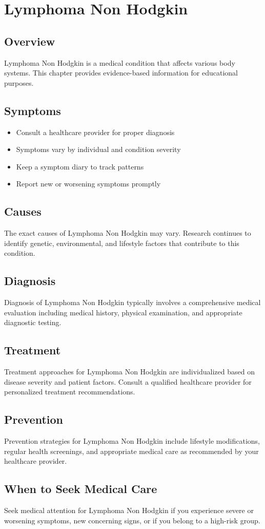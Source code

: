 \chapter{Lymphoma Non Hodgkin}

\section*{Overview}
Lymphoma Non Hodgkin is a medical condition that affects various body systems. This chapter provides evidence-based information for educational purposes.

\section*{Symptoms}
\begin{itemize}
  \item Consult a healthcare provider for proper diagnosis
  \item Symptoms vary by individual and condition severity
  \item Keep a symptom diary to track patterns
  \item Report new or worsening symptoms promptly
\end{itemize}

\section*{Causes}
The exact causes of Lymphoma Non Hodgkin may vary. Research continues to identify genetic, environmental, and lifestyle factors that contribute to this condition.

\section*{Diagnosis}
Diagnosis of Lymphoma Non Hodgkin typically involves a comprehensive medical evaluation including medical history, physical examination, and appropriate diagnostic testing.

\section*{Treatment}
Treatment approaches for Lymphoma Non Hodgkin are individualized based on disease severity and patient factors. Consult a qualified healthcare provider for personalized treatment recommendations.

\section*{Prevention}
Prevention strategies for Lymphoma Non Hodgkin include lifestyle modifications, regular health screenings, and appropriate medical care as recommended by your healthcare provider.

\section*{When to Seek Medical Care}
Seek medical attention for Lymphoma Non Hodgkin if you experience severe or worsening symptoms, new concerning signs, or if you belong to a high-risk group.
\clearpage
